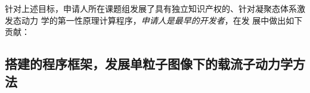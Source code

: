 针对上述目标，申请人所在课题组发展了具有独立知识产权的、针对凝聚态体系激发态动力
学的第一性原理计算程序\hnamd{}，\emph{申请人是\hnamd{}最早的开发者}，在\hnamd{}发
展中做出如下贡献：





\subsection{搭建\hnamd{}的程序框架，发展单粒子图像下的载流子动力学方法}

